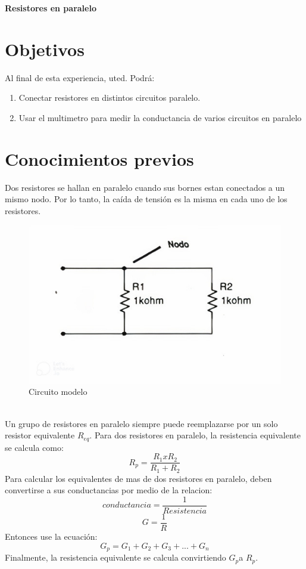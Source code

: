 \thispagestyle{fancy}
\begin{center}
	\LARGE{\textbf{Resistores en paralelo}}
\end{center}
\section{Objetivos}
Al final de esta experiencia, uted. Podrá:
\begin{enumerate}
	\item Conectar resistores en distintos circuitos paralelo. 
	\item Usar el multimetro para medir la conductancia de varios circuitos en paralelo
\end{enumerate} 
\section{Conocimientos previos}
Dos resistores se hallan en paralelo cuando sus bornes estan conectados a un mismo nodo. Por lo tanto, la caída de tensión es la misma en cada uno de los resistores. 
\begin{figure}[h]
	\centering
	\includegraphics[scale=0.5]{imagenes/2}
	\caption{Circuito modelo}
\end{figure}
\\
Un grupo de resistores en paralelo siempre puede reemplazarse por un solo resistor equivalente $R_{eq}$.
Para dos resistores en paralelo, la resistencia equivalente se calcula como: 
\begin{equation*}
	R_{p}=\frac{R_{1} xR_{2}}{R_{1}+R_{2} }
\end{equation*}
Para calcular los equivalentes de mas de dos resistores en paralelo, deben convertirse a sus conductancias por medio de la relacion: 
\begin{equation*}
	conductancia=\frac{1}{Resistencia}    
\end{equation*}
\begin{equation*}
	 G= \frac{1}{R}
\end{equation*}
Entonces use la ecuación: 
\begin{equation*}
	G_{p}= G_{1} + G_{2} + G_{3} + . . . + G_{n}
\end{equation*}
Finalmente, la resistencia equivalente se calcula convirtiendo $G_{p}$a $R_{p}$.

